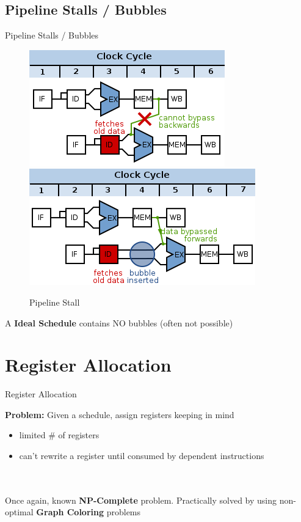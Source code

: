 \documentclass{beamer}
\begin{document}
\begin{darkframes}
\subsection{Pipeline Stalls / Bubbles}
\begin{frame}{Pipeline Stalls / Bubbles}
\begin{figure}
\includegraphics[scale=0.4]{figures/bubbles}
\includegraphics[scale=0.4]{figures/bubbles2}
\caption{Pipeline Stall}
\end{figure}

A {\bf \color{green} Ideal Schedule} contains NO bubbles (often not possible)
\end{frame}


\section{Register Allocation}

\begin{frame}{Register Allocation}

	{\bf \color{cyan} Problem:} Given a schedule, assign registers keeping in mind
	\begin{itemize}
		\item limited \# of registers
		\item can't rewrite a register until consumed by dependent instructions
	\end{itemize}
	\qquad \\
	\qquad \\
	Once again, known {\bf \color{green} NP-Complete} problem. Practically solved by using non-optimal {\bf \color{green} Graph Coloring} problems 
\end{frame}


\end{darkframes}
\end{document}
